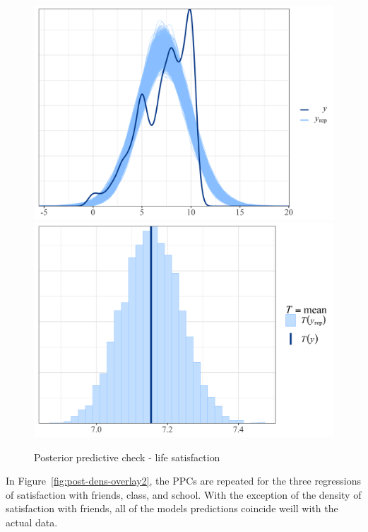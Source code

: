 \documentclass[a4, 12pt]{article}
\begin{document}
\begin{figure}[H]
\includegraphics[width=0.5\linewidth,]{../figures/post_dens_overlay} \includegraphics[width=0.5\linewidth,]{../figures/post_skew} \caption{Posterior predictive check - life satisfaction}\label{fig:post-dens-overlay}
\end{figure}

In Figure~\ref{fig:post-dens-overlay2}, the PPCs are repeated for the three regressions of satisfaction with friends, class, and school. With the exception of the density of satisfaction with friends, all of the models predictions coincide weill with the actual data.
\end{document}
